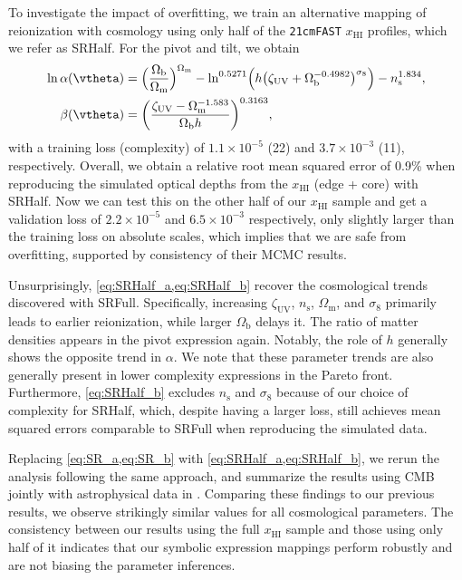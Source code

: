 \documentclass[12pt, a4paper]{article}
\newcommand{\ns}{n_\mathrm{s}}
\newcommand{\Omegam}{\Omega_\mathrm{m}}
\newcommand{\Omegab}{\Omega_\mathrm{b}}
\newcommand{\zetaUV}{\zeta_\mathrm{UV}}
\newcommand{\HI}{\mathrm{HI}}
\newcommand{\ap}{\alpha}
\begin{document}
To investigate the impact of overfitting, we train an alternative
mapping of reionization with cosmology using only half of the
\texttt{21cmFAST} $x_\HI$ profiles, which we refer as SRHalf.
For the pivot and tilt, we obtain
%
\begin{align}
\label{eq:SRHalf_a}
\ln\ap(\vtheta) &= \Bigl(\frac{\Omegab}{\Omegam}\Bigr)^{\Omegam}
  - \ln^{0.5271} \Bigl(h \bigl(\zetaUV
    + \Omegab^{-0.4982}\bigr)^{\sigma_8}\Bigr)
  - \ns^{1.834}, \\
%
\label{eq:SRHalf_b}
\beta(\vtheta) &= \biggl(\frac{\zetaUV - \Omegam^{-1.583}}{\Omegab h}
  \biggr)^{0.3163},
\end{align}
%
with a training loss (complexity) of $1.1 \times 10^{-5}$ (22) and $3.7
\times 10^{-3}$ (11), respectively.
Overall, we obtain a relative root mean squared error of 0.9\% when
reproducing the simulated optical depths from the $x_\HI$ (edge + core)
with SRHalf.
Now we can test this on the other half of our $x_\HI$ sample and get a
validation loss of $2.2 \times 10^{-5}$ and $6.5 \times 10^{-3}$
respectively, only slightly larger than the training loss on absolute
scales, which implies that we are safe from overfitting, supported by
consistency of their MCMC results.

Unsurprisingly, \cref{eq:SRHalf_a,eq:SRHalf_b} recover the cosmological
trends discovered with SRFull.
Specifically, increasing $\zetaUV$, $\ns$, $\Omegam$, and $\sigma_8$
primarily leads to earlier reionization, while larger $\Omegab$ delays
it.
The ratio of matter densities appears in the pivot expression again.
Notably, the role of $h$ generally shows the opposite trend in $\alpha$.
We note that these parameter trends are also generally present in lower
complexity expressions in the Pareto front.
Furthermore, \cref{eq:SRHalf_b} excludes $\ns$ and $\sigma_8$ because of
our choice of complexity for SRHalf, which, despite having a larger
loss, still achieves mean squared errors comparable to SRFull when
reproducing the simulated data.

Replacing \cref{eq:SR_a,eq:SR_b} with \cref{eq:SRHalf_a,eq:SRHalf_b}, we
rerun the analysis following the same approach, and summarize the
results using CMB jointly with astrophysical data in
.
Comparing these findings to our previous results, we observe strikingly
similar values for all cosmological parameters.
The consistency between our results using the full $x_\HI$ sample and
those using only half of it indicates that our symbolic expression
mappings perform robustly and are not biasing the parameter inferences.
\end{document}
